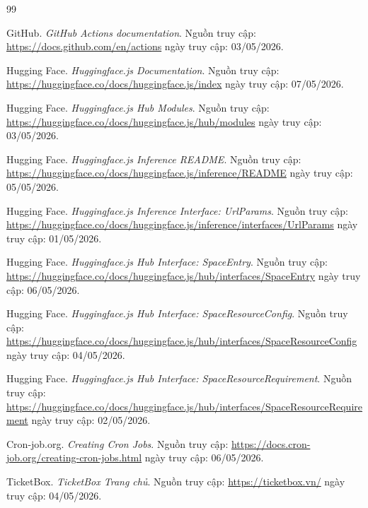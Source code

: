 \begin{thebibliography}{99}

GitHub. \textit{GitHub Actions documentation}. 
Nguồn truy cập: \url{https://docs.github.com/en/actions} ngày truy cập: 03/05/2026.

Hugging Face. \textit{Huggingface.js Documentation}. 
Nguồn truy cập: \url{https://huggingface.co/docs/huggingface.js/index} ngày truy cập: 07/05/2026.

Hugging Face. \textit{Huggingface.js Hub Modules}. 
Nguồn truy cập: \url{https://huggingface.co/docs/huggingface.js/hub/modules} ngày truy cập: 03/05/2026.

Hugging Face. \textit{Huggingface.js Inference README}. 
Nguồn truy cập: \url{https://huggingface.co/docs/huggingface.js/inference/README} ngày truy cập: 05/05/2026.

Hugging Face. \textit{Huggingface.js Inference Interface: UrlParams}. 
Nguồn truy cập: \url{https://huggingface.co/docs/huggingface.js/inference/interfaces/UrlParams} ngày truy cập: 01/05/2026.

Hugging Face. \textit{Huggingface.js Hub Interface: SpaceEntry}. 
Nguồn truy cập: \url{https://huggingface.co/docs/huggingface.js/hub/interfaces/SpaceEntry} ngày truy cập: 06/05/2026.

Hugging Face. \textit{Huggingface.js Hub Interface: SpaceResourceConfig}. 
Nguồn truy cập: \url{https://huggingface.co/docs/huggingface.js/hub/interfaces/SpaceResourceConfig} ngày truy cập: 04/05/2026.

Hugging Face. \textit{Huggingface.js Hub Interface: SpaceResourceRequirement}. 
Nguồn truy cập: \url{https://huggingface.co/docs/huggingface.js/hub/interfaces/SpaceResourceRequirement} ngày truy cập: 02/05/2026.

Cron-job.org. \textit{Creating Cron Jobs}. 
Nguồn truy cập: \url{https://docs.cron-job.org/creating-cron-jobs.html} ngày truy cập: 06/05/2026.

TicketBox. \textit{TicketBox Trang chủ}. 
Nguồn truy cập: \url{https://ticketbox.vn/} ngày truy cập: 04/05/2026.


\end{thebibliography}
